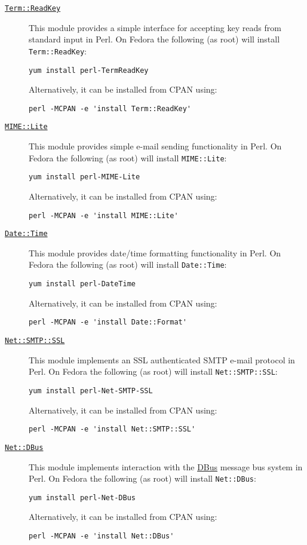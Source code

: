 \begin{description}
  \item [\href{http://search.cpan.org/dist/TermReadKey/ReadKey.pm}{{\tt Term::ReadKey}}] This module provides a simple interface for accepting key reads from standard input in Perl. On Fedora the following (as root) will install {\tt Term::ReadKey}:
\begin{verbatim}
yum install perl-TermReadKey
\end{verbatim}
Alternatively, it can be installed from CPAN using:
\begin{verbatim}
perl -MCPAN -e 'install Term::ReadKey'
\end{verbatim}
  \item [\href{http://search.cpan.org/~rjbs/MIME-Lite-3.027/lib/MIME/Lite.pm}{{\tt MIME::Lite}}] This module provides simple e-mail sending functionality in Perl. On Fedora the following (as root) will install {\tt MIME::Lite}:
\begin{verbatim}
yum install perl-MIME-Lite
\end{verbatim}
Alternatively, it can be installed from CPAN using:
\begin{verbatim}
perl -MCPAN -e 'install MIME::Lite'
\end{verbatim}
  \item [\href{http://search.cpan.org/~gbarr/TimeDate-1.20/lib/Date/Format.pm}{{\tt Date::Time}}] This module provides date/time formatting functionality in Perl. On Fedora the following (as root) will install {\tt Date::Time}:
\begin{verbatim}
yum install perl-DateTime
\end{verbatim}
Alternatively, it can be installed from CPAN using:
\begin{verbatim}
perl -MCPAN -e 'install Date::Format'
\end{verbatim}
  \item [\href{http://search.cpan.org/~cwest/Net-SMTP-SSL-1.01/lib/Net/SMTP/SSL.pm}{{\tt Net::SMTP::SSL}}] This module implements an SSL authenticated SMTP e-mail protocol in Perl. On Fedora the following (as root) will install {\tt Net::SMTP::SSL}:
\begin{verbatim}
yum install perl-Net-SMTP-SSL
\end{verbatim}
Alternatively, it can be installed from CPAN using:
\begin{verbatim}
perl -MCPAN -e 'install Net::SMTP::SSL'
\end{verbatim}
  \item [\href{http://search.cpan.org/~danberr/Net-DBus-0.33.6/lib/Net/DBus.pm}{{\tt Net::DBus}}] This module implements interaction with the \href{http://www.freedesktop.org/wiki/Software/dbus}{DBus} message bus system in Perl. On Fedora the following (as root) will install {\tt Net::DBus}:
\begin{verbatim}
yum install perl-Net-DBus
\end{verbatim}
Alternatively, it can be installed from CPAN using:
\begin{verbatim}
perl -MCPAN -e 'install Net::DBus'
\end{verbatim}


\end{description}
